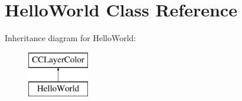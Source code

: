 \hypertarget{class_hello_world}{\section{Hello\-World Class Reference}
\label{class_hello_world}
}
Inheritance diagram for Hello\-World\-:\begin{figure}[H]
\begin{center}
\leavevmode
\includegraphics[height=2.000000cm]{class_hello_world}
\end{center}
\end{figure}
